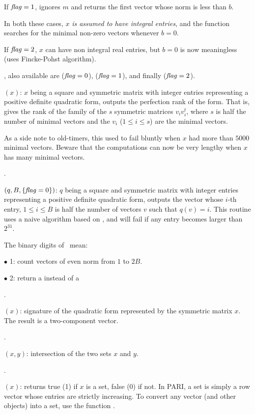 If $\hbox{\it f\kern0pt lag\/}=1$, ignores $m$ and returns the first vector whose norm is less than
$b$.

In both these cases, $x$ \emph{is assumed to have integral entries}, and the
function searches for the minimal non-zero vectors whenever $b=0$.

If $\hbox{\it f\kern0pt lag\/}=2$, $x$ can have non integral real entries, but $b=0$ is now
meaningless (uses Fincke-Pohst algorithm).

, also available are 
($\hbox{\it f\kern0pt lag\/}=0$),  ($\hbox{\it f\kern0pt lag\/}=1$), and finally
 ($\hbox{\it f\kern0pt lag\/}=2$).

$(x)$: $x$ being a square and symmetric matrix with
integer entries representing a positive definite quadratic form, outputs the
perfection rank of the form. That is, gives the rank of the family of the $s$
symmetric matrices $v_iv_i^t$, where $s$ is half the number of minimal
vectors and the $v_i$ ($1\le i\le s$) are the minimal vectors.

As a side note to old-timers, this used to fail bluntly when $x$ had more
than $5000$ minimal vectors. Beware that the computations can now be very
lengthy when $x$ has many minimal vectors.

.

$(q, B, \{\hbox{\it f\kern0pt lag\/} = 0\})$: $q$ being a square and symmetric
matrix with integer entries representing a positive definite quadratic form,
outputs the vector whose $i$-th entry, $1 \leq i \leq B$ is half the number
of vectors $v$ such that $q(v) = i$. This routine uses a naive algorithm
based on , and will fail if any entry becomes larger than
$2^{31}$.

\noindent The binary digits of \fl\ mean:

$\bullet$ 1: count vectors of even norm from $1$ to $2B$.

$\bullet$ 2: return a  instead of a 

.

$(x)$: signature of the quadratic form represented by the
symmetric matrix $x$. The result is a two-component vector.

.

$(x,y)$: intersection of the two sets $x$ and $y$.

.

$(x)$: returns true (1) if $x$ is a set, false (0) if
not. In PARI, a set is simply a row vector whose entries are strictly
increasing. To convert any vector (and other objects) into a set, use the
function .

